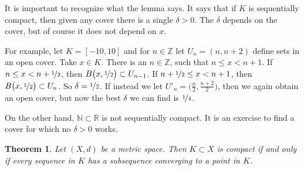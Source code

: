 \documentclass[12pt,openany]{book}
\newcommand{\R}{{\mathbb{R}}}
\newcommand{\Z}{{\mathbb{Z}}}
\newcommand{\N}{{\mathbb{N}}}
\theoremstyle{plain}
\newtheorem{thm}{Theorem}[section]
\theoremstyle{remark}
\theoremstyle{definition}
\theoremstyle{exercise}
\theoremstyle{example}
\begin{document}
It is important to recognize what the lemma says.  It says that
if $K$ is sequentially compact, then given any
cover there is a single $\delta > 0$.  The $\delta$ depends on the cover,
but of course it does not depend on $x$.

For example, let $K = [-10,10]$ and for $n \in \Z$ let $U_n =
(n,n+2)$ define sets in an open cover.
Take $x \in K$. There is an $n \in \Z$, 
such that $n \leq x < n+1$.
If $n \leq x < n+\nicefrac{1}{2}$, then
$B\bigl(x,\nicefrac{1}{2}\bigr) \subset U_{n-1}$.
If $n+ \nicefrac{1}{2} \leq x < n+1$, then
$B\bigl(x,\nicefrac{1}{2}\bigr) \subset U_{n}$.  So $\delta =
\nicefrac{1}{2}$.  If instead we let $U'_n =
\bigl(\frac{n}{2},\frac{n+2}{2} \bigr)$, then we again obtain an open
cover, but now the best $\delta$ we can find is $\nicefrac{1}{4}$.

On the other hand, $\N \subset \R$ is not sequentially compact.
It is an exercise to find a cover for which no $\delta > 0$ works.


\begin{thm} \label{thm:mscompactisseqcpt}
Let $(X,d)$ be a metric space.  Then $K \subset X$ is compact if
and only if every sequence in $K$ has a subsequence converging to
a point in $K$.
\end{thm}
\end{document}
